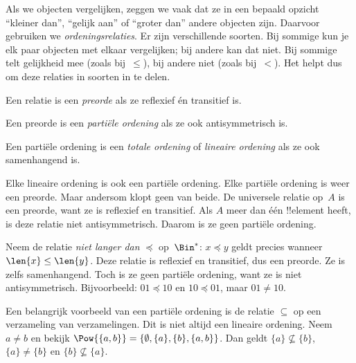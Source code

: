 \documentclass[../../../include/open-logic-section]{subfiles}
\begin{document}

\begin{explain}
Als we objecten vergelijken, zeggen we vaak dat ze in een bepaald opzicht
``kleiner dan'', ``gelijk aan'' of ``groter dan'' andere objecten zijn. Daarvoor
gebruiken we \emph{ordeningsrelaties}. Er zijn verschillende soorten. Bij
sommige kun je elk paar objecten met elkaar vergelijken; bij andere kan dat
niet. Bij sommige telt gelijkheid mee (zoals bij~$\le$), bij andere niet (zoals
bij~$<$). Het helpt dus om deze relaties in soorten in te delen.
\end{explain}

\begin{defn}[Preorde]
Een relatie is een \emph{preorde} als ze reflexief én transitief is.  
\end{defn}

\begin{defn}
Een preorde is een \emph{partiële ordening} als ze ook antisymmetrisch is.
\end{defn}

\begin{defn}
Een partiële ordening is een \emph{totale ordening} of \emph{lineaire
ordening} als ze ook samenhangend is.
\end{defn}

\begin{ex}
Elke lineaire ordening is ook een partiële ordening. Elke partiële ordening is
weer een preorde. Maar andersom klopt geen van beide. De universele relatie
op~$A$ is een preorde, want ze is reflexief en transitief. Als $A$ meer dan één
!!{element} heeft, is deze relatie niet antisymmetrisch. Daarom is ze geen
partiële ordening.
\end{ex}

\begin{ex}
Neem de relatie \emph{niet langer dan} $\preccurlyeq$ op~$\Bin^*$:
$x \preccurlyeq y$ geldt precies wanneer $\len{x} \le \len{y}$. Deze relatie
is reflexief en transitief, dus een preorde. Ze is zelfs samenhangend. Toch is
ze geen partiële ordening, want ze is niet antisymmetrisch. Bijvoorbeeld: $01
\preccurlyeq 10$ en $10 \preccurlyeq 01$, maar $01 \neq 10$.
\end{ex}

\begin{ex}
Een belangrijk voorbeeld van een partiële ordening is de relatie $\subseteq$ op
een verzameling van verzamelingen. Dit is niet altijd een lineaire ordening.
Neem $a \neq b$ en bekijk
$\Pow{\{a, b\}} = \{\emptyset, \{a\}, \{b\}, \{a,b\}\}$. Dan geldt
$\{a\} \nsubseteq \{b\}$, $\{a\} \neq \{b\}$ en $\{b\}
\nsubseteq \{a\}$.
\end{ex}
\end{document}
